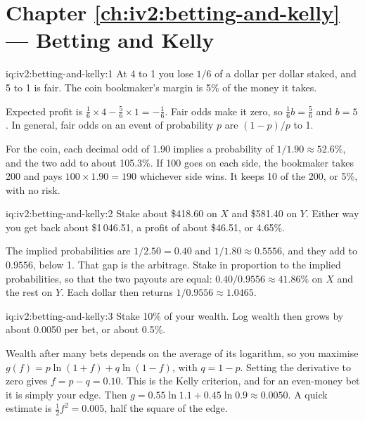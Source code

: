 \section*{Chapter \ref{ch:iv2:betting-and-kelly} --- Betting and Kelly}

\begin{solution}{iq:iv2:betting-and-kelly:1}
At 4 to 1 you lose $1/6$ of a dollar per dollar staked, and 5 to 1 is fair. The coin bookmaker's margin is 5\% of the money it takes.

Expected profit is $\tfrac16 \times 4 - \tfrac56 \times 1 = -\tfrac16$. Fair odds make it zero, so $\tfrac16 b = \tfrac56$ and $b = 5$. In general, fair odds on an event of probability $p$ are $(1 - p)/p$ to 1.

For the coin, each decimal odd of 1.90 implies a probability of $1/1.90 \approx 52.6\%$, and the two add to about 105.3\%. If 100 goes on each side, the bookmaker takes 200 and pays $100 \times 1.90 = 190$ whichever side wins. It keeps 10 of the 200, or 5\%, with no risk.

\end{solution}

\begin{solution}{iq:iv2:betting-and-kelly:2}
Stake about \$418.60 on $X$ and \$581.40 on $Y$. Either way you get back about \$1\,046.51, a profit of about \$46.51, or 4.65\%.

The implied probabilities are $1/2.50 = 0.40$ and $1/1.80 \approx 0.5556$, and they add to $0.9556$, below 1. That gap is the arbitrage. Stake in proportion to the implied probabilities, so that the two payouts are equal: $0.40/0.9556 \approx 41.86\%$ on $X$ and the rest on $Y$. Each dollar then returns $1/0.9556 \approx 1.0465$.

\end{solution}

\begin{solution}{iq:iv2:betting-and-kelly:3}
Stake 10\% of your wealth. Log wealth then grows by about 0.0050 per bet, or about 0.5\%.

Wealth after many bets depends on the average of its logarithm, so you maximise $g(f) = p\ln(1 + f) + q\ln(1 - f)$, with $q = 1 - p$. Setting the derivative to zero gives $f = p - q = 0.10$. This is the Kelly criterion, and for an even-money bet it is simply your edge. Then $g = 0.55\ln 1.1 + 0.45\ln 0.9 \approx 0.0050$. A quick estimate is $\tfrac12 f^2 = 0.005$, half the square of the edge.

\end{solution}

